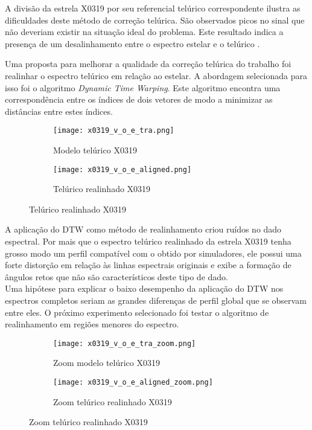 \documentclass[a1]{sciposter}
\begin{document}
\begin{multicols}{2}
A divisão da estrela X0319 \cite{Chen2014TheXS} por seu referencial telúrico correspondente ilustra as dificuldades deste método de correção telúrica. São observados picos no sinal que não deveriam existir na situação ideal do problema. Este resultado indica a presença de um desalinhamento entre o espectro estelar e o telúrico \cite{unpublished-xshooter-data-release}.


Uma proposta para melhorar a qualidade da correção telúrica do trabalho foi realinhar o espectro telúrico em relação ao estelar. A abordagem selecionada para isso foi o algoritmo \textit{Dynamic Time Warping}. Este algoritmo encontra uma correspondência entre os índices de dois vetores de modo a minimizar as distâncias entre estes índices.

\begin{figure}
 \centering
 \begin{subfigure}{0.4\textwidth}
  \centering
  \texttt{[image: x0319\_v\_o\_e\_tra.png]}
  \caption{Modelo telúrico X0319}
 \end{subfigure}\hfil
 \begin{subfigure}{0.4\textwidth}
  \centering
  \texttt{[image: x0319\_v\_o\_e\_aligned.png]}
  \caption{Telúrico realinhado X0319}
 \end{subfigure}\hfil
\end{figure}

A aplicação do DTW como método de realinhamento criou ruídos no dado espectral. Por mais que o espectro telúrico realinhado da estrela X0319 \cite{Chen2014TheXS} tenha grosso modo um perfil compatível com o obtido por simuladores, ele possui uma forte distorção em relação às linhas espectrais originais e exibe a formação de ângulos retos que não são característicos deste tipo de dado. \\

Uma hipótese para explicar o baixo desempenho da aplicação do DTW nos espectros completos seriam as grandes diferenças de perfil global que se observam entre eles. O próximo experimento selecionado foi testar o algoritmo de realinhamento em regiões menores do espectro.

\begin{figure}
 \centering
 \begin{subfigure}{0.4\textwidth}
  \centering
  \texttt{[image: x0319\_v\_o\_e\_tra\_zoom.png]}
  \caption{Zoom modelo telúrico X0319}
 \end{subfigure}\hfil
 \begin{subfigure}{0.4\textwidth}
  \centering
  \texttt{[image: x0319\_v\_o\_e\_aligned\_zoom.png]}
  \caption{Zoom telúrico realinhado X0319}
 \end{subfigure}\hfil
\end{figure}


\end{multicols}
\end{document}
